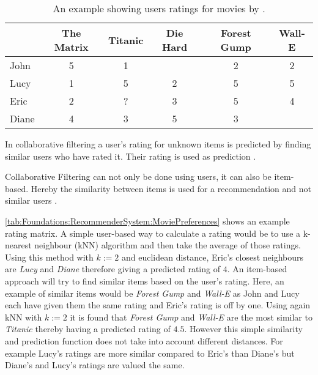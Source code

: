 \begin{table}[tb]
    \centering    
    \begin{tabular}{ l | c | c | c | c | c }
        & The Matrix & Titanic & Die Hard & Forest Gump & Wall-E \\ \hline
         John  & 5 & 1 &   & 2 & 2 \\
         Lucy  & 1 & 5 & 2 & 5 & 5 \\
         Eric  & 2 & ? & 3 & 5 & 4 \\
         Diane & 4 & 3 & 5 & 3 &   \\
    \end{tabular}
    \caption[Movies: Rating Matrix]{An example showing users ratings for movies by \citeauthor{ningComprehensiveSurveyNeighborhoodBased2015} \cite{ningComprehensiveSurveyNeighborhoodBased2015}.}  
    \label{tab:Foundations:RecommenderSystem:MoviePreferences}
\end{table}

In collaborative filtering a user's rating for unknown items is predicted by finding similar users who have rated it. Their rating is used as prediction \cite[~ pp. 7, 8]{felfernigDecisionTasksBasic2018}.

Collaborative Filtering can not only be done using users, it can also be item-based. Hereby the similarity between items is used for a recommendation and not similar users \cite{ricciRecommenderSystemsHandbook2015}.

\autoref{tab:Foundations:RecommenderSystem:MoviePreferences} shows an example rating matrix. A simple user-based way to calculate a rating would be to use a k-nearest neighbour (kNN) algorithm and then take the average of those ratings. Using this method with $k := 2$ and euclidean distance, Eric's closest neighbours are \textit{Lucy} and \textit{Diane} therefore giving a predicted rating of $4$. An item-based approach will try to find similar items based on the user's rating. Here, an example of similar items would be \textit{Forest Gump} and \textit{Wall-E} as John and Lucy each have given them the same rating and Eric's rating is off by one. Using again kNN with $k := 2$ it is found that \textit{Forest Gump} and \textit{Wall-E} are the most similar to \textit{Titanic} thereby having a predicted rating of $4.5$. However this simple similarity and prediction function does not take into account different distances. For example Lucy's ratings are more similar compared to Eric's than Diane's but Diane's and Lucy's ratings are valued the same.

